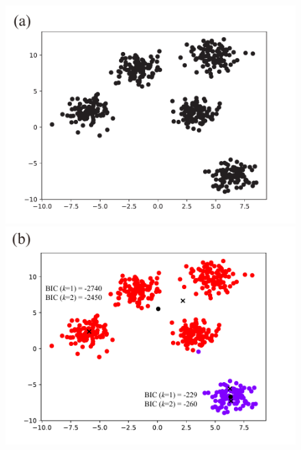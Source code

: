 \begin{figure}[htbp]
  \begin{minipage}{0.5\hsize}
    \begin{center}
      \includegraphics[width=1\linewidth]{img/xmeans/a.pdf}
    \end{center}
  \end{minipage}
  \begin{minipage}{0.5\hsize}
    \begin{center}
      \includegraphics[width=1\linewidth]{img/xmeans/b.pdf}
    \end{center}
  \end{minipage}\\
  \begin{minipage}{0.5\hsize}

\end{minipage}
\end{figure}
